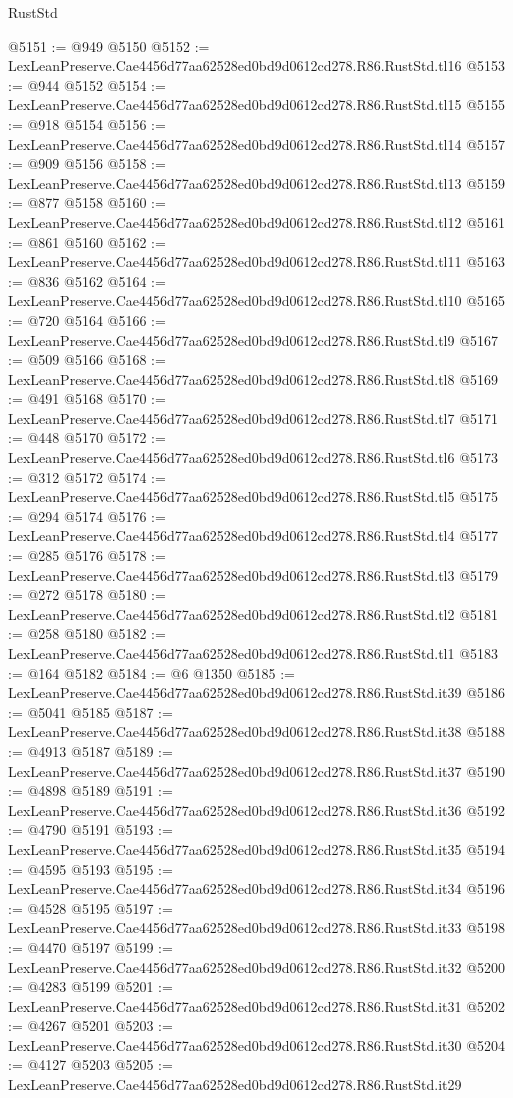 \begin{lexlean}{RustStd}
\begin{coremodule}
@5151 := @949 @5150
@5152 := LexLeanPreserve.Cae4456d77aa62528ed0bd9d0612cd278.R86.RustStd.tl16
@5153 := @944 @5152
@5154 := LexLeanPreserve.Cae4456d77aa62528ed0bd9d0612cd278.R86.RustStd.tl15
@5155 := @918 @5154
@5156 := LexLeanPreserve.Cae4456d77aa62528ed0bd9d0612cd278.R86.RustStd.tl14
@5157 := @909 @5156
@5158 := LexLeanPreserve.Cae4456d77aa62528ed0bd9d0612cd278.R86.RustStd.tl13
@5159 := @877 @5158
@5160 := LexLeanPreserve.Cae4456d77aa62528ed0bd9d0612cd278.R86.RustStd.tl12
@5161 := @861 @5160
@5162 := LexLeanPreserve.Cae4456d77aa62528ed0bd9d0612cd278.R86.RustStd.tl11
@5163 := @836 @5162
@5164 := LexLeanPreserve.Cae4456d77aa62528ed0bd9d0612cd278.R86.RustStd.tl10
@5165 := @720 @5164
@5166 := LexLeanPreserve.Cae4456d77aa62528ed0bd9d0612cd278.R86.RustStd.tl9
@5167 := @509 @5166
@5168 := LexLeanPreserve.Cae4456d77aa62528ed0bd9d0612cd278.R86.RustStd.tl8
@5169 := @491 @5168
@5170 := LexLeanPreserve.Cae4456d77aa62528ed0bd9d0612cd278.R86.RustStd.tl7
@5171 := @448 @5170
@5172 := LexLeanPreserve.Cae4456d77aa62528ed0bd9d0612cd278.R86.RustStd.tl6
@5173 := @312 @5172
@5174 := LexLeanPreserve.Cae4456d77aa62528ed0bd9d0612cd278.R86.RustStd.tl5
@5175 := @294 @5174
@5176 := LexLeanPreserve.Cae4456d77aa62528ed0bd9d0612cd278.R86.RustStd.tl4
@5177 := @285 @5176
@5178 := LexLeanPreserve.Cae4456d77aa62528ed0bd9d0612cd278.R86.RustStd.tl3
@5179 := @272 @5178
@5180 := LexLeanPreserve.Cae4456d77aa62528ed0bd9d0612cd278.R86.RustStd.tl2
@5181 := @258 @5180
@5182 := LexLeanPreserve.Cae4456d77aa62528ed0bd9d0612cd278.R86.RustStd.tl1
@5183 := @164 @5182
@5184 := @6 @1350
@5185 := LexLeanPreserve.Cae4456d77aa62528ed0bd9d0612cd278.R86.RustStd.it39
@5186 := @5041 @5185
@5187 := LexLeanPreserve.Cae4456d77aa62528ed0bd9d0612cd278.R86.RustStd.it38
@5188 := @4913 @5187
@5189 := LexLeanPreserve.Cae4456d77aa62528ed0bd9d0612cd278.R86.RustStd.it37
@5190 := @4898 @5189
@5191 := LexLeanPreserve.Cae4456d77aa62528ed0bd9d0612cd278.R86.RustStd.it36
@5192 := @4790 @5191
@5193 := LexLeanPreserve.Cae4456d77aa62528ed0bd9d0612cd278.R86.RustStd.it35
@5194 := @4595 @5193
@5195 := LexLeanPreserve.Cae4456d77aa62528ed0bd9d0612cd278.R86.RustStd.it34
@5196 := @4528 @5195
@5197 := LexLeanPreserve.Cae4456d77aa62528ed0bd9d0612cd278.R86.RustStd.it33
@5198 := @4470 @5197
@5199 := LexLeanPreserve.Cae4456d77aa62528ed0bd9d0612cd278.R86.RustStd.it32
@5200 := @4283 @5199
@5201 := LexLeanPreserve.Cae4456d77aa62528ed0bd9d0612cd278.R86.RustStd.it31
@5202 := @4267 @5201
@5203 := LexLeanPreserve.Cae4456d77aa62528ed0bd9d0612cd278.R86.RustStd.it30
@5204 := @4127 @5203
@5205 := LexLeanPreserve.Cae4456d77aa62528ed0bd9d0612cd278.R86.RustStd.it29

\end{coremodule}
\end{lexlean}
